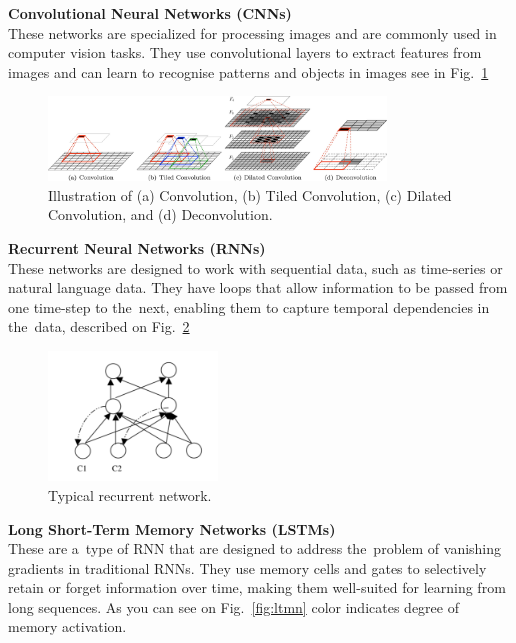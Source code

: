 \textbf{Convolutional Neural Networks (CNNs)}\\
These networks are specialized for processing images and are commonly used in computer vision tasks. They use convolutional layers to extract features from images and can learn to recognise patterns and objects in images see in Fig.~\ref{fig:cn}
    \begin{center}
        \begin{figure}[!ht]
            \centering
            \includegraphics[width=0.8\textwidth]{figures/cn}
            \caption{Illustration of (a) Convolution, (b) Tiled Convolution, (c) Dilated Convolution, and (d)
                Deconvolution. \cite{GU2018354}}
            \label{fig:cn}
        \end{figure}
    \end{center}
\textbf{Recurrent Neural Networks (RNNs)}\\
These networks are designed to work with sequential data, such as time-series or natural language data. They have loops that allow information to be passed from one time-step to the~next, enabling them to capture temporal dependencies in the~data, described on Fig.~\ref{fig:rn}
    \begin{center}
        \begin{figure}[!ht]
            \centering
            \includegraphics[width=0.4\textwidth]{figures/rn}
            \caption{Typical recurrent network. \cite{medsker2001recurrent}}
            \label{fig:rn}
        \end{figure}
    \end{center}
\textbf{Long Short-Term Memory Networks (LSTMs)}\\
These are a~type of RNN that are designed to address the~problem of vanishing gradients in traditional RNNs. They use memory cells and gates to selectively retain or forget information over time, making them well-suited for learning from long sequences. As you can see on Fig.~\ref{fig:ltmn} color indicates degree of memory activation.

